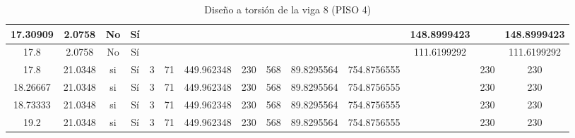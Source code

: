\begin{table}[H]
{\begin{tabular}{|c|c|c|c|c|c|c|c|c|c|c|c|c|c|}
\hline
17.30909 & 2.0758 & No  & Sí  &     &     &     &     &     &     &     & 148.8999423 &     & 148.8999423 \bigstrut\\
\hline
17.8 & 2.0758 & No  & Sí  &     &     &     &     &     &     &     & 111.6199292 &     & 111.6199292 \bigstrut\\
\hline
17.8 & 21.0348 & si  & Sí  & 3   & 71  & 449.962348 & 230 & 568 & 89.8295564 & 754.8756555 &     & 230 & 230 \bigstrut\\
\hline
18.26667 & 21.0348 & si  & Sí  & 3   & 71  & 449.962348 & 230 & 568 & 89.8295564 & 754.8756555 &     & 230 & 230 \bigstrut\\
\hline
18.73333 & 21.0348 & si  & Sí  & 3   & 71  & 449.962348 & 230 & 568 & 89.8295564 & 754.8756555 &     & 230 & 230 \bigstrut\\
\hline
19.2 & 21.0348 & si  & Sí  & 3   & 71  & 449.962348 & 230 & 568 & 89.8295564 & 754.8756555 &     & 230 & 230 \bigstrut\\
\hline
\end{tabular}%

  


  }
      \caption{Diseño a torsión de la viga 8 (PISO 4) }
  \label{tab:T VG8 P4 }%
\end{table}%
